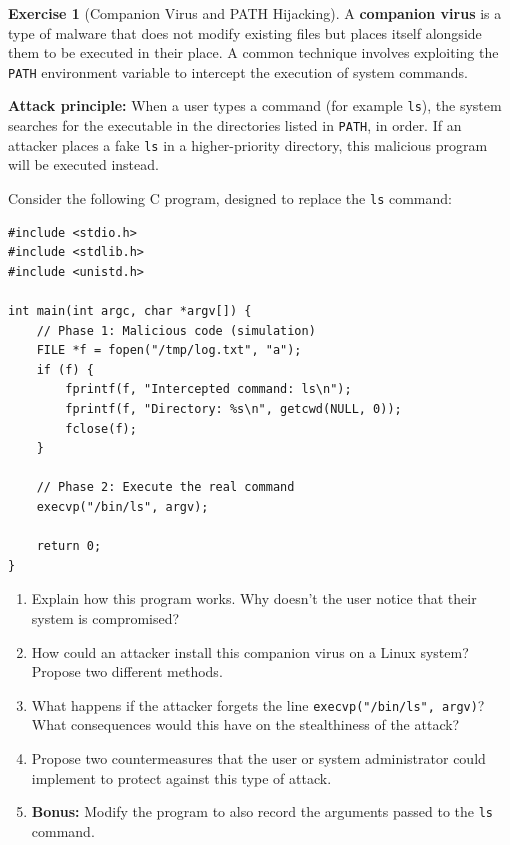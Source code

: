 \documentclass[a4paper,11pt]{article}
\theoremstyle{plain}
\theoremstyle{definition}
\newtheorem{exercice}{Exercise}
\begin{document}
\begin{exercice}[Companion Virus and PATH Hijacking]

A \textbf{companion virus} is a type of malware that does not modify existing files but places itself alongside them to be executed in their place. A common technique involves exploiting the \texttt{PATH} environment variable to intercept the execution of system commands.

\textbf{Attack principle:} When a user types a command (for example \texttt{ls}), the system searches for the executable in the directories listed in \texttt{PATH}, in order. If an attacker places a fake \texttt{ls} in a higher-priority directory, this malicious program will be executed instead.

Consider the following C program, designed to replace the \texttt{ls} command:

\begin{verbatim}
#include <stdio.h>
#include <stdlib.h>
#include <unistd.h>

int main(int argc, char *argv[]) {
    // Phase 1: Malicious code (simulation)
    FILE *f = fopen("/tmp/log.txt", "a");
    if (f) {
        fprintf(f, "Intercepted command: ls\n");
        fprintf(f, "Directory: %s\n", getcwd(NULL, 0));
        fclose(f);
    }

    // Phase 2: Execute the real command
    execvp("/bin/ls", argv);

    return 0;
}
\end{verbatim}

\begin{enumerate}
\item Explain how this program works. Why doesn't the user notice that their system is compromised?

\item How could an attacker install this companion virus on a Linux system? Propose two different methods.

\item What happens if the attacker forgets the line \texttt{execvp("/bin/ls", argv)}? What consequences would this have on the stealthiness of the attack?

\item Propose two countermeasures that the user or system administrator could implement to protect against this type of attack.

\item \textbf{Bonus:} Modify the program to also record the arguments passed to the \texttt{ls} command.
\end{enumerate}

\end{exercice}
\end{document}
